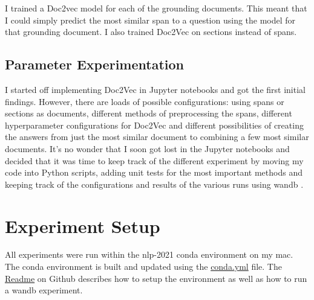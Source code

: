 \documentclass[11pt]{article}
\begin{document}
    I trained a Doc2vec model for each of the grounding documents. This meant that I could simply predict
    the most similar span to a question using the model for that grounding document. I also trained Doc2Vec on sections instead
    of spans.

    \subsection{Parameter Experimentation}\label{subsec:experimentation-method}
    I started off implementing Doc2Vec in Jupyter notebooks and got the first initial findings. However, there are loads
    of possible configurations: using spans or sections as documents, different methods of preprocessing the spans, different
    hyperparameter configurations for Doc2Vec and different possibilities of creating the answers from just the most similar
    document to combining a few most similar documents. It's no wonder that I soon got lost in the Jupyter notebooks and
    decided that it was time to keep track of the different experiment by moving my code into Python scripts, adding
    unit tests for the most important methods and keeping track of the configurations and results of the various runs using
    wandb \cite{wandb}.


    \section{Experiment Setup}\label{sec:experiment-setup}

    All experiments were run within the nlp-2021 conda environment on my mac. The conda environment is built and updated using the
    \href{https://github.com/isabelladegen/nlp-2021/blob/main/conda.yml}{conda.yml} file. The
    \href{https://github.com/isabelladegen/nlp-2021}{Readme} on Github describes how to setup the environment as well
    as how to run a wandb experiment.
\end{document}
